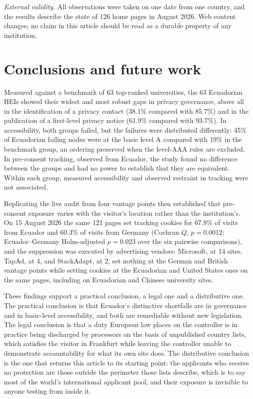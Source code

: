 \documentclass[pdflatex,sn-basic,Numbered,iicol]{sn-jnl}
\theoremstyle{thmstyleone}
\theoremstyle{thmstyletwo}
\theoremstyle{thmstylethree}
\begin{document}
	\emph{External validity.} All observations were taken on one date from one country, and the results describe the state of 126 home pages in August 2026. Web content changes; no claim in this article should be read as a durable property of any institution.
	
	\section{Conclusions and future work}\label{sec:conclusions}
	
	Measured against a benchmark of 63 top-ranked universities, the 63 Ecuadorian HEIs showed their widest and most robust gaps in privacy governance, above all in the identification of a privacy contact (38.1\% compared with 85.7\%) and in the publication of a first-level privacy notice (61.9\% compared with 93.7\%). In accessibility, both groups failed, but the failures were distributed differently: 45\% of Ecuadorian failing nodes were at the basic level A compared with 19\% in the benchmark group, an ordering preserved when the level-AAA rules are excluded. In pre-consent tracking, observed from Ecuador, the study found no difference between the groups and had no power to establish that they are equivalent. Within each group, measured accessibility and observed restraint in tracking were not associated.
	
	Replicating the live audit from four vantage points then established that pre-consent exposure varies with the visitor's location rather than the institution's. On 15 August 2026 the same 121 pages set tracking cookies for 67.8\% of visits from Ecuador and 60.3\% of visits from Germany (Cochran $Q$, $p=0.0012$; Ecuador--Germany Holm-adjusted $p=0.023$ over the six pairwise comparisons), and the suppression was executed by advertising vendors: Microsoft, at 14 sites, TapAd, at 4, and StackAdapt, at 2, set nothing at the German and British vantage points while setting cookies at the Ecuadorian and United States ones on the same pages, including on Ecuadorian and Chinese university sites.
	
	These findings support a practical conclusion, a legal one and a distributive one. The practical conclusion is that Ecuador's distinctive shortfalls are in governance and in basic-level accessibility, and both are remediable without new legislation. The legal conclusion is that a duty European law places on the controller is in practice being discharged by processors on the basis of unpublished country lists, which satisfies the visitor in Frankfurt while leaving the controller unable to demonstrate accountability for what its own site does. The distributive conclusion is the one that returns this article to its starting point: the applicants who receive no protection are those outside the perimeter those lists describe, which is to say most of the world's international applicant pool, and their exposure is invisible to anyone testing from inside it.
	
\end{document}
